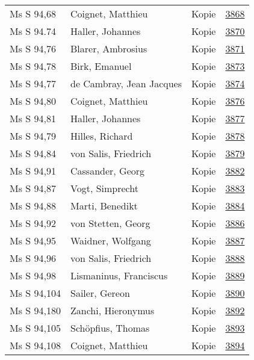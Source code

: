 \documentclass[10pt,a4paper,landscape]{report}
\begin{document}
\begin{longtable}{p{16cm}p{4cm}lr}
Ms S 94,68	&	Coignet, Matthieu	&	Kopie	&	\href{http://130.60.24.72/assignment/3868}{3868}\\
Ms S 94.74	&	Haller, Johannes	&	Kopie	&	\href{http://130.60.24.72/assignment/3870}{3870}\\
Ms S 94,76	&	Blarer, Ambrosius	&	Kopie	&	\href{http://130.60.24.72/assignment/3871}{3871}\\
Ms S 94,78	&	Birk, Emanuel	&	Kopie	&	\href{http://130.60.24.72/assignment/3873}{3873}\\
Ms S 94,77	&	de Cambray, Jean Jacques	&	Kopie	&	\href{http://130.60.24.72/assignment/3874}{3874}\\
Ms S 94,80	&	Coignet, Matthieu	&	Kopie	&	\href{http://130.60.24.72/assignment/3876}{3876}\\
Ms S 94,81	&	Haller, Johannes	&	Kopie	&	\href{http://130.60.24.72/assignment/3877}{3877}\\
Ms S 94,79	&	Hilles, Richard	&	Kopie	&	\href{http://130.60.24.72/assignment/3878}{3878}\\
Ms S 94,84	&	von Salis, Friedrich	&	Kopie	&	\href{http://130.60.24.72/assignment/3879}{3879}\\
Ms S 94,91	&	Cassander, Georg	&	Kopie	&	\href{http://130.60.24.72/assignment/3882}{3882}\\
Ms S 94,87	&	Vogt, Simprecht	&	Kopie	&	\href{http://130.60.24.72/assignment/3883}{3883}\\
Ms S 94,88	&	Marti, Benedikt	&	Kopie	&	\href{http://130.60.24.72/assignment/3884}{3884}\\
Ms S 94,92	&	von Stetten, Georg	&	Kopie	&	\href{http://130.60.24.72/assignment/3886}{3886}\\
Ms S 94,95	&	Waidner, Wolfgang	&	Kopie	&	\href{http://130.60.24.72/assignment/3887}{3887}\\
Ms S 94,96	&	von Salis, Friedrich	&	Kopie	&	\href{http://130.60.24.72/assignment/3888}{3888}\\
Ms S 94,98	&	Lismaninus, Franciscus	&	Kopie	&	\href{http://130.60.24.72/assignment/3889}{3889}\\
Ms S 94,104	&	Sailer, Gereon	&	Kopie	&	\href{http://130.60.24.72/assignment/3890}{3890}\\
Ms S 94,180	&	Zanchi, Hieronymus	&	Kopie	&	\href{http://130.60.24.72/assignment/3892}{3892}\\
Ms S 94,105	&	Schöpfius, Thomas	&	Kopie	&	\href{http://130.60.24.72/assignment/3893}{3893}\\
Ms S 94,108	&	Coignet, Matthieu	&	Kopie	&	\href{http://130.60.24.72/assignment/3894}{3894}\\

\end{longtable}
\end{document}
